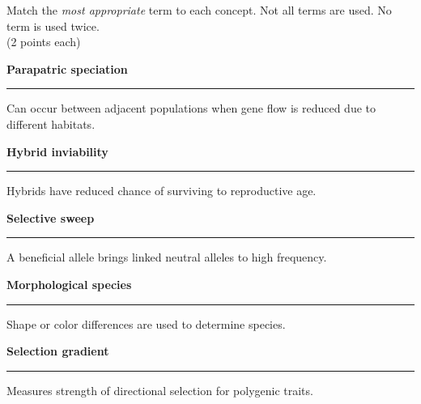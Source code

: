 \documentclass[12pt, addpoints]{exam}
\newcommand*\Matching[1]{
\ifprintanswers
	\textbf{#1}
\else
	\rule{2.1in}{0.5pt}
\fi
}
\newlength\matchlena
\newlength\matchlenb
\newcommand\MatchQuestion[2]{%
	\setlength\matchlenb{\linewidth}
	\addtolength\matchlenb{-\matchlena}
	\parbox[t]{\matchlena}{\Matching{#1}}\enspace\parbox[t]{\matchlenb}{#2}}
\newcommand{\bumppoints}[1]{%
	\addtocounter{numpoints}{#1}
}
\begin{document}
\noindent Match the \emph{most appropriate} term to each concept. Not all terms are used. No term is used twice.\\ (2 points each)

\begin{questions}
	

\vspace{-1\baselineskip}
\fullwidth{%

}
\vspace{0.6\baselineskip}

\bumppoints{10}

\question\MatchQuestion{Parapatric speciation}{Can occur between adjacent populations when gene flow is reduced due to different habitats.}
\vspace{0.5\baselineskip}
\question\MatchQuestion{Hybrid inviability}{Hybrids have reduced chance of surviving to reproductive age.} \vspace{0.5\baselineskip}
\question\MatchQuestion{Selective sweep}{A beneficial allele brings linked neutral alleles to high frequency.}
\vspace{0.5\baselineskip}
\question\MatchQuestion{Morphological species}{Shape or color differences are used to determine species.}
\vspace{0.5\baselineskip}
\question\MatchQuestion{Selection gradient}{Measures strength of directional selection for polygenic traits.}

\vspace{0.5\baselineskip}

\bumppoints{6}

%


\end{questions}
\end{document}
